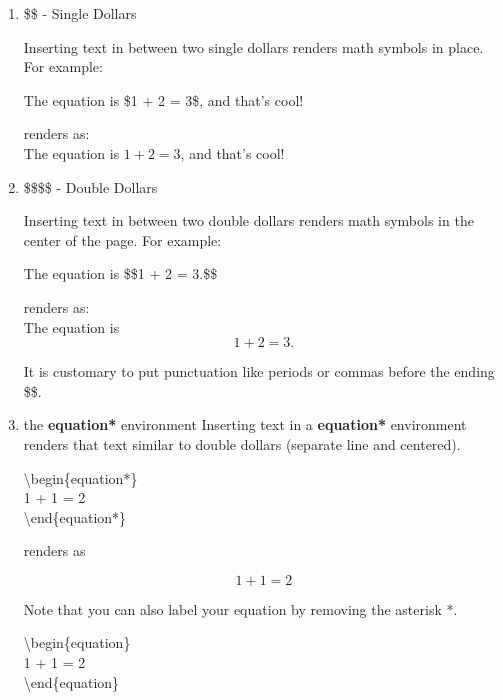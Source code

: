 \documentclass[11pt,onecolumn]{article}
\theoremstyle{definition}
\begin{document}
\begin{enumerate}
    \item \$\$ - Single Dollars
    
    Inserting text in between two single dollars renders math symbols in place. For example:
    
    \begin{tcolorbox}
    The equation is \$1 + 2 = 3\$, and that's cool!
    \end{tcolorbox}
    
    renders as:\\
    The equation is $1 + 2 = 3$, and that's cool!
    
    \item \$\$\$\$ - Double Dollars
    
    Inserting text in between two double dollars renders math symbols in the center of the page. For example:
    
    \begin{tcolorbox}
    The equation is \$\$1 + 2 = 3.\$\$
    \end{tcolorbox}
    
    renders as:\\
    The equation is $$1 + 2 = 3.$$
    
    It is customary to put punctuation like periods or commas before the ending \$\$.
    
    \item the \textbf{equation*} environment
    Inserting text in a \textbf{equation*} environment renders that text similar to double dollars (separate line and centered).
    
    \begin{tcolorbox}
    \textbackslash begin\{equation*\}\\
    1 + 1 = 2\\
    \textbackslash end\{equation*\}
    \end{tcolorbox}
    
    renders as
    
    \begin{equation*}
    1 + 1 = 2
    \end{equation*}
    
    Note that you can also label your equation by removing the asterisk *.
    
    \begin{tcolorbox}
    \textbackslash begin\{equation\}\\
    1 + 1 = 2\\
    \textbackslash end\{equation\}
    \end{tcolorbox}
    

\end{enumerate}
\end{document}
